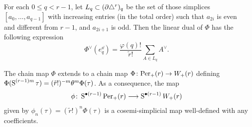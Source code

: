 \begin{remark}\label{remark:phidual}
	For each $0\leq q<r-1$, let $L_q \subset (\partial \triangle^{r})_q$ be the set of those simplices $[a_0,\dots, a_{q-1}]$ with increasing entries (in the total order) such that $a_{2i}$ is even and different from $r-1$, and $a_{2i+1}$ is odd. Then the linear dual of $\Phi$ has the following expression
	\begin{equation}\label{eq:111}
		\Phi^\vee(e_{q}^\dd) = \frac{\varphi(q)!}{\tilde{r}!}\sum_{A\in L_q} A^\vee.
	\end{equation}
\end{remark}

\begin{proposition}\label{prop:per_to_minimal}
	The chain map $\Phi$ extends to a chain map $\Phi\colon \mathrm{Per}_+(r)\to W_+(r)$ defining $\Phi(\operatorname{S}^{(r-1)m}\tau) = (\tilde{r}!)^{-m}\theta^{m}\Phi(\tau)$. As a consequence, the map 
	\[
		\phi\colon \operatorname{S}^{\bullet (r-1)}\mathrm{Per}_+(r)\longrightarrow \operatorname{S}^{\bullet(r-1)}W_+(r)
	\] 
	given by $\phi_n(\tau) = (\tilde{r}!)^n\Phi(\tau)$ is a cosemi-simplicial map well-defined with any coefficients.
\end{proposition}
